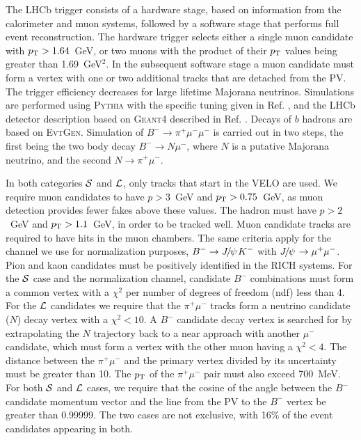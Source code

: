 \documentclass[12pt,a4paper]{article}
\def\Ppsi        {\ensuremath{\uppsi}\xspace}
\def\PB      {\ensuremath{\mathrm{B}}\xspace}
\def\PJ      {\ensuremath{\mathrm{J}}\xspace}
\def\Ppsi        {\ensuremath{\psi}\xspace}
\def\PB      {\ensuremath{B}\xspace}
\def\PJ      {\ensuremath{J}\xspace}
\def\B       {\ensuremath{\PB}\xspace}
\def\Bub     {\ensuremath{\B^-}\xspace}
\def\Bm      {\ensuremath{\Bub}\xspace}
\def\jpsi     {\ensuremath{{\PJ\mskip -3mu/\mskip -2mu\Ppsi\mskip 2mu}}\xspace}
\def\to                 {\ensuremath{\rightarrow}\xspace}
\def\pt         {\mbox{$p_{\rm T}$}\xspace}
\def\evtgen     {\mbox{\textsc{EvtGen}}\xspace}
\def\pythia     {\mbox{\textsc{Pythia}}\xspace}
\def\geant      {\mbox{\textsc{Geant4}}\xspace}
\begin{document}
 The LHCb trigger \cite{Aaij:2012me} consists of a hardware stage, based on information from the
calorimeter and muon systems, followed by a software stage that performs full event reconstruction. The hardware trigger selects either a  single muon candidate with $\pt>1.64$~GeV, or two muons with the product of their \pt values being greater than 1.69~GeV$^2$.  In the subsequent software stage  a muon candidate must form a vertex with one or two additional tracks that are detached from the PV.  The trigger efficiency decreases for large lifetime Majorana neutrinos. 
Simulations are performed using \pythia \cite{Sjostrand:2006za} with the specific
tuning given in Ref. \cite{LHCb-PROC-2011-005}, and the LHCb detector description based on \geant \cite{Allison:2006ve,*Agostinelli:2002hh}
described in Ref. \cite{LHCb-PROC-2011-006}. Decays of $b$ hadrons are based on \evtgen \cite{Lange:2001uf}. Simulation of $\Bm\to\pi^+\mu^-\mu^-$ is carried out in two steps, the first being the two body decay $\Bm\to N\mu^-$, where $N$ is a putative Majorana neutrino, and the second $N\to\pi^+\mu^-$.



 In both categories $\cal{S}$ and $\cal{L}$,  only tracks that start in the VELO are used. We require muon candidates to have $p>3$~GeV and $\pt>0.75$~GeV, as muon detection provides fewer fakes above these values.  The hadron must have $p>2$~GeV and $\pt>1.1$~GeV, in order to be tracked well.  Muon candidate tracks are required to have hits in the muon chambers. The same criteria apply for the channel we use for normalization purposes, $B^-\to\jpsi K^-$ with $\jpsi\to\mu^+\mu^-$. Pion and kaon candidates must be positively identified in the RICH systems.  
 For the $\cal{S}$ case and the normalization channel,  candidate \Bm combinations must form a common vertex with a $\chi^2$ per number of degrees of freedom (ndf) less than 4. For the $\cal{L}$ candidates we require that the $\pi^+\mu^-$ tracks form a neutrino candidate ($N$) decay vertex with a $\chi^2<10$. A \Bm candidate decay vertex is searched for by extrapolating the $N$ trajectory back to a near approach with another $\mu^-$ candidate, which 
must form a vertex with the other muon having a $\chi^2 <4$. The distance between the $\pi^+\mu^-$ and the primary vertex divided by its uncertainty must be greater than 10. The \pt of the $\pi^+\mu^-$ pair must also exceed 700~MeV. For both $\cal{S}$ and $\cal{L}$ cases, we require that the cosine of the angle between the \Bm candidate momentum vector and the line from the PV to the \Bm vertex  be greater than 0.99999. 
  The two cases are not exclusive, with 16\% of the event candidates appearing in both.
\end{document}
